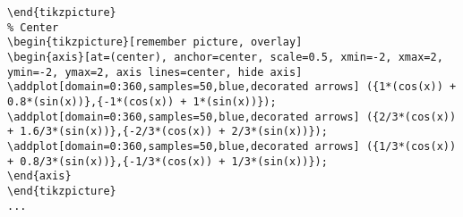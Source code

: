 \begin{lstlisting}
\end{tikzpicture}
% Center
\begin{tikzpicture}[remember picture, overlay]
\begin{axis}[at=(center), anchor=center, scale=0.5, xmin=-2, xmax=2, ymin=-2, ymax=2, axis lines=center, hide axis]
\addplot[domain=0:360,samples=50,blue,decorated arrows] ({1*(cos(x)) + 0.8*(sin(x))},{-1*(cos(x)) + 1*(sin(x))});
\addplot[domain=0:360,samples=50,blue,decorated arrows] ({2/3*(cos(x)) + 1.6/3*(sin(x))},{-2/3*(cos(x)) + 2/3*(sin(x))});
\addplot[domain=0:360,samples=50,blue,decorated arrows] ({1/3*(cos(x)) + 0.8/3*(sin(x))},{-1/3*(cos(x)) + 1/3*(sin(x))});
\end{axis}
\end{tikzpicture}
...
\end{lstlisting}
